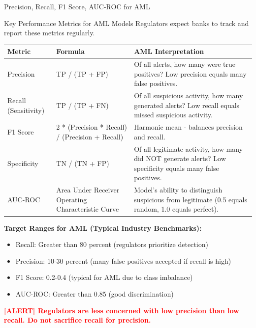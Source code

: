 \documentclass[11pt,a4paper]{beamer}
\newcommand{\redflag}[1]{\textcolor{red}{\textbf{[ALERT] #1}}}
\begin{document}
	\begin{frame}{Precision, Recall, F1 Score, AUC-ROC for AML}
		\begin{block}{Key Performance Metrics for AML Models}
			Regulators expect banks to track and report these metrics regularly.
		\end{block}
		
		\begin{longtable}{p{}|p{}|p{}}
			\hline
			\rowcolor{lightgray}
			\textbf{Metric} & \textbf{Formula} & \textbf{AML Interpretation} \\
			\hline
			Precision & TP / (TP + FP) & Of all alerts, how many were true positives? Low precision equals many false positives. \\
			\hline
			Recall (Sensitivity) & TP / (TP + FN) & Of all suspicious activity, how many generated alerts? Low recall equals missed suspicious activity. \\
			\hline
			F1 Score & 2 * (Precision * Recall) / (Precision + Recall) & Harmonic mean - balances precision and recall. \\
			\hline
			Specificity & TN / (TN + FP) & Of all legitimate activity, how many did NOT generate alerts? Low specificity equals many false positives. \\
			\hline
			AUC-ROC & Area Under Receiver Operating Characteristic Curve & Model's ability to distinguish suspicious from legitimate (0.5 equals random, 1.0 equals perfect). \\
			\hline
		\end{longtable}
		
		\textbf{Target Ranges for AML (Typical Industry Benchmarks):}
		\begin{itemize}
			\item Recall: Greater than 80 percent (regulators prioritize detection)
			\item Precision: 10-30 percent (many false positives accepted if recall is high)
			\item F1 Score: 0.2-0.4 (typical for AML due to class imbalance)
			\item AUC-ROC: Greater than 0.85 (good discrimination)
		\end{itemize}
		
		\redflag{Regulators are less concerned with low precision than low recall. Do not sacrifice recall for precision.}
	\end{frame}
	
\end{document}

